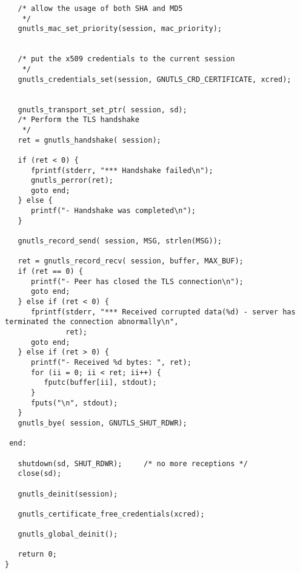 \begin{verbatim}
   /* allow the usage of both SHA and MD5
    */
   gnutls_mac_set_priority(session, mac_priority);


   /* put the x509 credentials to the current session
    */
   gnutls_credentials_set(session, GNUTLS_CRD_CERTIFICATE, xcred);


   gnutls_transport_set_ptr( session, sd);
   /* Perform the TLS handshake
    */
   ret = gnutls_handshake( session);

   if (ret < 0) {
      fprintf(stderr, "*** Handshake failed\n");
      gnutls_perror(ret);
      goto end;
   } else {
      printf("- Handshake was completed\n");
   }

   gnutls_record_send( session, MSG, strlen(MSG));

   ret = gnutls_record_recv( session, buffer, MAX_BUF);
   if (ret == 0) {
      printf("- Peer has closed the TLS connection\n");
      goto end;
   } else if (ret < 0) {
      fprintf(stderr, "*** Received corrupted data(%d) - server has terminated the connection abnormally\n",
              ret);
      goto end;
   } else if (ret > 0) {
      printf("- Received %d bytes: ", ret);
      for (ii = 0; ii < ret; ii++) {
         fputc(buffer[ii], stdout);
      }
      fputs("\n", stdout);
   }
   gnutls_bye( session, GNUTLS_SHUT_RDWR);

 end:

   shutdown(sd, SHUT_RDWR);     /* no more receptions */
   close(sd);

   gnutls_deinit(session);

   gnutls_certificate_free_credentials(xcred);

   gnutls_global_deinit();

   return 0;
}

\end{verbatim}
